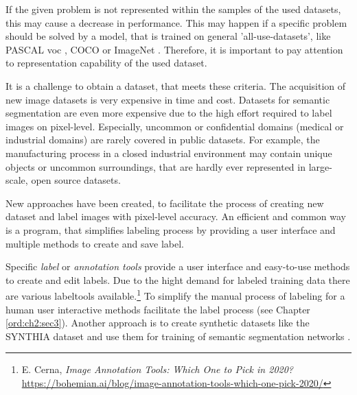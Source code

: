 \begin{itemize}
	If the given problem is not represented within the samples of the used datasets, this may cause a decrease in performance.
	This may happen if a specific problem should be solved by a model, that is trained on general 'all-use-datasets', like PASCAL \gls{voc} \cite{Eve20-PascalVOC}, COCO \cite{Lin14-Coco} or ImageNet \cite{Deng09-ImageNet}.
	Therefore, it is important to pay attention to representation capability of the used dataset.
\end{itemize} 
It is a challenge to obtain a dataset, that meets these criteria.
The acquisition of new image datasets is very expensive in time and cost.
Datasets for semantic segmentation are even more expensive due to the high effort required to label images on pixel-level.
Especially, uncommon or confidential domains (\eg medical or industrial domains) are rarely covered in public datasets.
For example, the manufacturing process in a closed industrial environment may contain unique objects or uncommon surroundings, that are hardly ever represented in large-scale, open source datasets.

New approaches have been created, to facilitate the process of creating new dataset and label images with pixel-level accuracy.
An efficient and common way is a program, that simplifies labeling process by providing a user interface and multiple methods to create and save label.

Specific \textit{label} or \textit{annotation tools} provide a user interface and easy-to-use methods to create and edit labels. 
Due to the hight demand for labeled training data there are various labeltools available.\footnote{E. Cerna, \textit{Image Annotation Tools: Which One to Pick in 2020?} \url{https://bohemian.ai/blog/image-annotation-tools-which-one-pick-2020/}}
To simplify the manual process of labeling for a human user interactive methods facilitate the label process (see Chapter \ref{ord:ch2:sec3}).
Another approach is to create synthetic datasets like the SYNTHIA dataset \cite{Zol19-Temporal} and use them for training of semantic segmentation networks \cite{Chen18-SyntheticData}.


